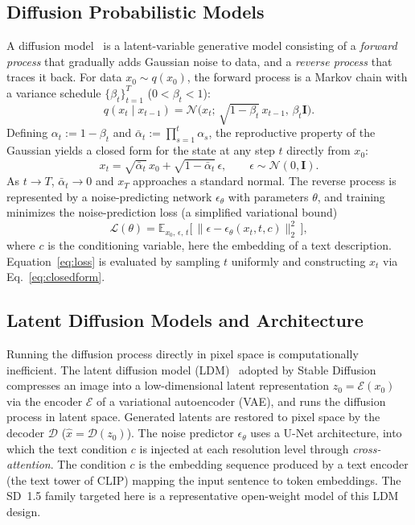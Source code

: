 \documentclass[10pt,twocolumn]{article}
\begin{document}
\subsection{Diffusion Probabilistic Models}
A diffusion model~\cite{ho2020ddpm} is a latent-variable generative model consisting of a \emph{forward process} that gradually adds Gaussian noise to data, and a \emph{reverse process} that traces it back. For data $x_0\sim q(x_0)$, the forward process is a Markov chain with a variance schedule $\{\beta_t\}_{t=1}^{T}$ ($0<\beta_t<1$):
\begin{equation}
q(x_t\mid x_{t-1}) = \mathcal{N}\!\big(x_t;\,\sqrt{1-\beta_t}\,x_{t-1},\,\beta_t\mathbf{I}\big).
\end{equation}
Defining $\alpha_t:=1-\beta_t$ and $\bar\alpha_t:=\prod_{s=1}^{t}\alpha_s$, the reproductive property of the Gaussian yields a closed form for the state at any step $t$ directly from $x_0$:
\begin{equation}
x_t = \sqrt{\bar\alpha_t}\,x_0 + \sqrt{1-\bar\alpha_t}\,\epsilon,\qquad \epsilon\sim\mathcal{N}(0,\mathbf{I}).
\label{eq:closedform}
\end{equation}
As $t\to T$, $\bar\alpha_t\to 0$ and $x_T$ approaches a standard normal. The reverse process is represented by a noise-predicting network $\epsilon_\theta$ with parameters $\theta$, and training minimizes the noise-prediction loss (a simplified variational bound)
\begin{equation}
\mathcal{L}(\theta)=\mathbb{E}_{x_0,\,\epsilon,\,t}\Big[\,\big\lVert\epsilon-\epsilon_\theta(x_t,t,c)\big\rVert_2^2\,\Big],
\label{eq:loss}
\end{equation}
where $c$ is the conditioning variable, here the embedding of a text description. Equation~\eqref{eq:loss} is evaluated by sampling $t$ uniformly and constructing $x_t$ via Eq.~\eqref{eq:closedform}.

\subsection{Latent Diffusion Models and Architecture}
Running the diffusion process directly in pixel space is computationally inefficient. The latent diffusion model (LDM)~\cite{rombach2022ldm} adopted by Stable Diffusion compresses an image into a low-dimensional latent representation $z_0=\mathcal{E}(x_0)$ via the encoder $\mathcal{E}$ of a variational autoencoder (VAE), and runs the diffusion process in latent space. Generated latents are restored to pixel space by the decoder $\mathcal{D}$ ($\hat{x}=\mathcal{D}(z_0)$). The noise predictor $\epsilon_\theta$ uses a U-Net architecture, into which the text condition $c$ is injected at each resolution level through \emph{cross-attention}. The condition $c$ is the embedding sequence produced by a text encoder (the text tower of CLIP) mapping the input sentence to token embeddings. The SD~1.5 family targeted here is a representative open-weight model of this LDM design.
\end{document}
